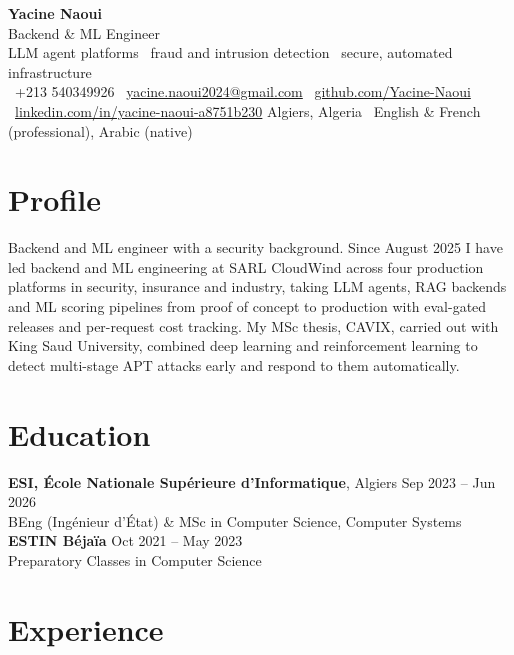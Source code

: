 \documentclass[10pt,a4paper]{article}
\begin{document}
\begin{center}
  {\LARGE\bfseries Yacine Naoui}\\[3pt]
  {\large Backend \& ML Engineer}\\[2pt]
  {\small LLM agent platforms \textperiodcentered\ fraud and intrusion detection \textperiodcentered\ secure, automated infrastructure}\\[5pt]
  \small
  \faPhone~+213 540349926 \quad
  \faEnvelope~\href{mailto:yacine.naoui2024@gmail.com}{yacine.naoui2024@gmail.com} \quad
  \faGithub~\href{https://github.com/Yacine-Naoui}{github.com/Yacine-Naoui}\\[2pt]
  \faLinkedin~\href{https://www.linkedin.com/in/yacine-naoui-a8751b230/}{linkedin.com/in/yacine-naoui-a8751b230} \quad
  Algiers, Algeria \textperiodcentered\ English \& French (professional), Arabic (native)
\end{center}

\section*{Profile}
Backend and ML engineer with a security background. Since August 2025 I have led backend and ML engineering at SARL CloudWind across four production platforms in security, insurance and industry, taking LLM agents, RAG backends and ML scoring pipelines from proof of concept to production with eval-gated releases and per-request cost tracking. My MSc thesis, CAVIX, carried out with King Saud University, combined deep learning and reinforcement learning to detect multi-stage APT attacks early and respond to them automatically.

\section*{Education}
\textbf{ESI, École Nationale Supérieure d'Informatique}, Algiers \hfill Sep 2023 -- Jun 2026\\
BEng (Ingénieur d'État) \& MSc in Computer Science, Computer Systems\\[2pt]
\textbf{ESTIN Béjaïa} \hfill Oct 2021 -- May 2023\\
Preparatory Classes in Computer Science

\section*{Experience}
\end{document}
